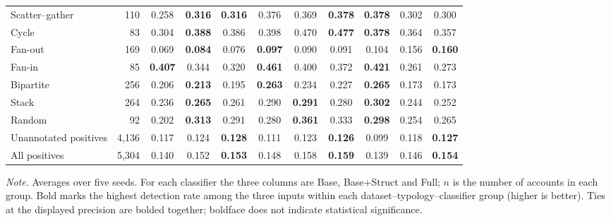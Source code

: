 \begin{table}[htbp]
\begin{threeparttable}
\begin{tabular}{lrccccccccc}
Scatter--gather & 110 & 0.258 & \textbf{0.316} & \textbf{0.316} & 0.376 & 0.369 & \textbf{0.378} & \textbf{0.378} & 0.302 & 0.300 \\
Cycle & 83 & 0.304 & \textbf{0.388} & 0.386 & 0.398 & 0.470 & \textbf{0.477} & \textbf{0.378} & 0.364 & 0.357 \\
Fan-out & 169 & 0.069 & \textbf{0.084} & 0.076 & \textbf{0.097} & 0.090 & 0.091 & 0.104 & 0.156 & \textbf{0.160} \\
Fan-in & 85 & \textbf{0.407} & 0.344 & 0.320 & \textbf{0.461} & 0.400 & 0.372 & \textbf{0.421} & 0.261 & 0.273 \\
Bipartite & 256 & 0.206 & \textbf{0.213} & 0.195 & \textbf{0.263} & 0.234 & 0.227 & \textbf{0.265} & 0.173 & 0.173 \\
Stack & 264 & 0.236 & \textbf{0.265} & 0.261 & 0.290 & \textbf{0.291} & 0.280 & \textbf{0.302} & 0.244 & 0.252 \\
Random & 92 & 0.202 & \textbf{0.313} & 0.291 & 0.280 & \textbf{0.361} & 0.333 & \textbf{0.298} & 0.254 & 0.265 \\
\midrule
Unannotated positives & 4,136 & 0.117 & 0.124 & \textbf{0.128} & 0.111 & 0.123 & \textbf{0.126} & 0.099 & 0.118 & \textbf{0.127} \\
All positives & 5,304 & 0.140 & 0.152 & \textbf{0.153} & 0.148 & 0.158 & \textbf{0.159} & 0.139 & 0.146 & \textbf{0.154} \\
\bottomrule
\end{tabular}
\begin{tablenotes}[flushleft]
\scriptsize
\setlength{\labelsep}{0pt}\item[] \textit{Note.} Averages over five seeds. For each classifier the three columns are Base, Base+Struct and Full; $n$ is the number of accounts in each group. Bold marks the highest detection rate among the three inputs within each dataset--typology--classifier group (higher is better). Ties at the displayed precision are bolded together; boldface does not indicate statistical significance.
\end{tablenotes}
\end{threeparttable}
\end{table}
